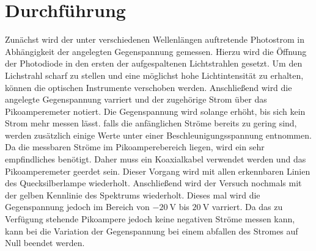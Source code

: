 
\section{Durchführung}
\label{sec:Durchführung}
Zunächst wird der unter verschiedenen Wellenlängen auftretende Photostrom in
Abhängigkeit der angelegten Gegenspannung gemessen. Hierzu wird die Öffnung der
Photodiode in den ersten der aufgespaltenen Lichtstrahlen gesetzt. Um den
Lichstrahl scharf zu stellen und eine möglichst hohe Lichtintensität zu erhalten,
 können die optischen Instrumente verschoben werden.
 Anschließend wird die angelegte Gegenspannung varriert und der zugehörige Strom
 über das Pikoamperemeter notiert. Die Gegenspannung wird solange erhöht, bis sich
 kein Strom mehr messen lässt. falls die anfänglichen Ströme bereits zu gering sind,
 werden zusätzlich einige Werte unter einer Beschleunigungsspannung entnommen.
 Da die messbaren Ströme im Pikoamperebereich liegen,
 wird ein sehr empfindliches benötigt. Daher muss ein Koaxialkabel verwendet werden
 und das Pikoamperemeter geerdet sein. Dieser Vorgang wird mit allen erkennbaren
 Linien des Quecksilberlampe wiederholt.
 Anschließend wird der Versuch nochmals mit der gelben Kennlinie des Spektrums
 wiederholt. Dieses mal wird die Gegenspannung jedoch im Bereich von
 $\SI{-20}{\volt}$ bis $\SI{20}{\volt}$ varriert. Da das zu Verfügung stehende
 Pikoampere jedoch keine negativen Ströme messen kann, kann bei die Variation der
 Gegenspannung bei einem abfallen des Stromes auf Null beendet werden.
